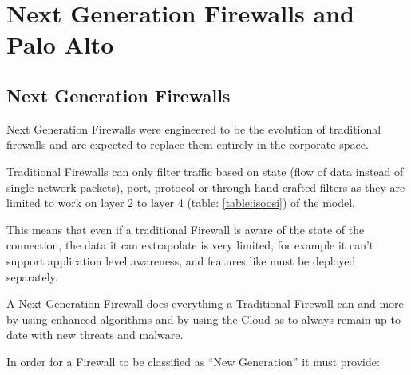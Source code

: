 \section{Next Generation Firewalls and Palo Alto}

\subsection{Next Generation Firewalls}

Next Generation Firewalls were engineered to be the evolution of traditional firewalls and are expected to replace them entirely in the corporate space.

Traditional Firewalls can only filter traffic based on state (flow of data instead of single network packets), port, protocol or through hand crafted filters as they are limited to work on layer 2 to layer 4
(table: \ref{table:isoosi}) of the  model.

This means that even if a traditional Firewall is aware of the state of the connection, the data it can extrapolate is very limited, for example it can't support application level awareness, and features like  must be deployed separately.

A Next Generation Firewall does everything a Traditional Firewall can and more by using  enhanced algorithms  and by using the Cloud as to always remain up to date with new threats and malware.

\newpage

In order for a Firewall to be classified as ``New Generation'' it must provide\cite{ngfw-cisco}:

